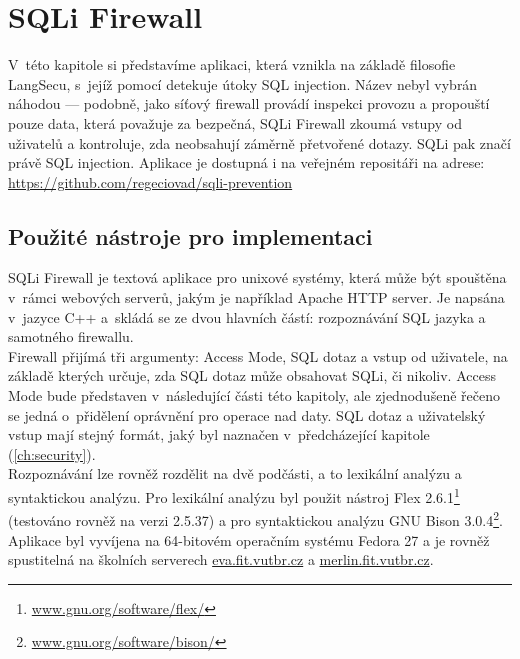 
\chapter{SQLi Firewall} \label{ch:sqlifirewall}
V~této kapitole si představíme aplikaci, která vznikla na základě filosofie LangSecu, s~jejíž pomocí 
detekuje útoky SQL injection. Název nebyl vybrán náhodou --- podobně, jako síťový firewall provádí inspekci provozu a propouští pouze data, která 
považuje za bezpečná, SQLi Firewall zkoumá vstupy od uživatelů a kontroluje, zda neobsahují záměrně přetvořené dotazy. SQLi pak značí právě
SQL injection. Aplikace je dostupná i na veřejném repositáři na adrese: \url{https://github.com/regeciovad/sqli-prevention}

\section{Použité nástroje pro implementaci} \label{sec:6:nastroje}
SQLi Firewall je textová aplikace pro unixové systémy, která může být spouštěna v~rámci webových serverů, jakým je například Apache HTTP server.
Je napsána v~jazyce C++ a~skládá se ze dvou hlavních částí: rozpoznávání SQL jazyka a samotného firewallu. \\

Firewall přijímá tři argumenty: Access Mode, SQL dotaz a vstup od uživatele, na základě kterých určuje, zda SQL dotaz může obsahovat SQLi, či nikoliv.
Access Mode bude představen v~následující části této kapitoly, ale zjednodušeně řečeno se jedná o~přidělení oprávnění pro operace nad daty. SQL dotaz 
a uživatelský vstup mají stejný formát, jaký byl naznačen v~předcházející kapitole (\ref{ch:security}). \\

Rozpoznávání lze rovněž rozdělit na dvě podčásti, a to lexikální analýzu a syntaktickou analýzu. Pro lexikální analýzu byl použit nástroj 
Flex 2.6.1\footnote{\url{www.gnu.org/software/flex/}} (testováno rovněž na verzi 2.5.37) a pro syntaktickou analýzu 
GNU Bison 3.0.4\footnote{\url{www.gnu.org/software/bison/}}. \\

Aplikace byl vyvíjena na 64-bitovém operačním systému Fedora 27 a je rovněž spustitelná na školních serverech \url{eva.fit.vutbr.cz} 
a \url{merlin.fit.vutbr.cz}. \\

